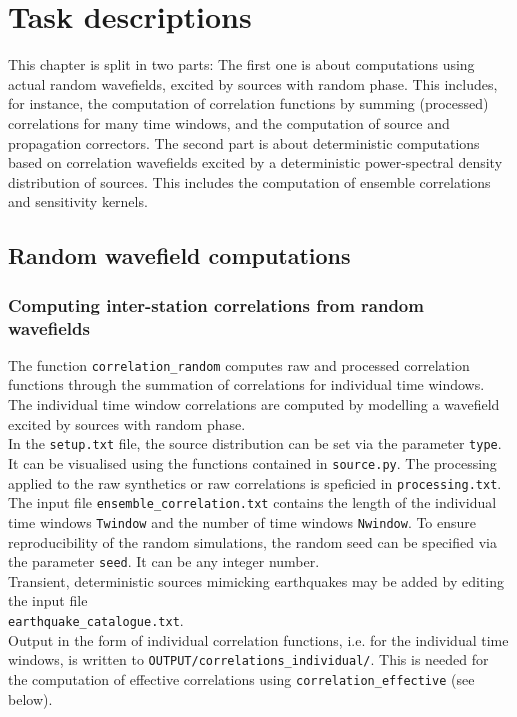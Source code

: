 \chapter{Task descriptions}

This chapter is split in two parts: The first one is about computations using actual random wavefields, excited by sources with random phase. This includes, for instance, the computation of correlation functions by summing (processed) correlations for many time windows, and the computation of source and propagation correctors. The second part is about deterministic computations based on correlation wavefields excited by a deterministic power-spectral density distribution of sources. This includes the computation of ensemble correlations and sensitivity kernels.

\section{Random wavefield computations}

\subsection{Computing inter-station correlations from random wavefields}

The function \texttt{correlation\_random} computes raw and processed correlation functions through the summation of correlations for individual time windows. The individual time window correlations are computed by modelling a wavefield excited by sources with random phase.\\[5pt]
%
In the \texttt{setup.txt} file, the source distribution can be set via the parameter \texttt{type}. It can be visualised using the functions contained in \texttt{source.py}. The processing applied to the raw synthetics or raw correlations is speficied in \texttt{processing.txt}. The input file \texttt{ensemble\_correlation.txt} contains the length of the individual time windows \texttt{Twindow} and the number of time windows \texttt{Nwindow}. To ensure reproducibility of the random simulations, the random seed can be specified via the parameter \texttt{seed}. It can be any integer number.\\[5pt]
%
Transient, deterministic sources mimicking earthquakes may be added by editing the input file\\ \texttt{earthquake\_catalogue.txt}.\\[5pt]
%
Output in the form of individual correlation functions, i.e. for the individual time windows, is written to \texttt{OUTPUT/correlations\_individual/}. This is needed for the computation of effective correlations using \texttt{correlation\_effective} (see below).

